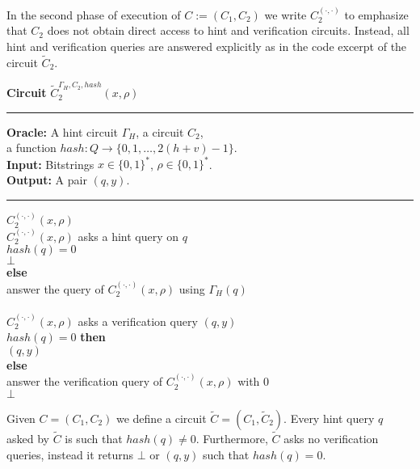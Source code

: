 %
In the second phase of execution of $C := (C_1, C_2)$ we write $C_2^{(\cdot, \cdot)}$ to emphasize that $C_2$ does not obtain
direct access to hint and verification circuits.
Instead, all hint and verification queries are answered explicitly as in the code excerpt of the circuit $\widetilde{C}_2$.
%
\begin{codeblock}
  \textbf{Circuit} $\widetilde{C}_2^{\Gamma_H, C_2, hash} (x, \rho)$
  \medskip \hrule \medskip
  \textbf{Oracle:} A hint circuit $\Gamma_H$, a circuit $C_2$, \\
  \IndII a function $hash : Q \rightarrow \{0,1,\dots, 2(h+v)-1\}$. \\
  \textbf{Input:} Bitstrings $x \in \{0,1\}^{*}$, $\rho \in \{0,1\}^{*}$. \\
  \textbf{Output:} A pair $(q, y)$.
  \medskip\hrule\medskip
  \Run $C_2^{(\cdot, \cdot)}(x, \rho)$ \\
  \IndI \If $C_2^{(\cdot, \cdot)}(x, \rho)$ asks a hint query on $q$ \Then\\
  \IndII \If $hash(q) = 0$ \Then\\
  \IndIII \Return $\bot$\\
  \IndII \textbf{else}\\
  \IndIII answer the query of $C_2^{(\cdot, \cdot)}(x, \rho)$ using $\Gamma_H(q)$\\
  \\
  \IndI \If $C_2^{(\cdot, \cdot)}(x, \rho)$ asks a verification query $(q, y)$ \Then \\
  \IndII \If $hash(q) = 0 $ \textbf{then} \\
  \IndIII \Return $(q, y)$ \\
  \IndII \textbf{else} \\
  \IndIII answer the verification query of $C_2^{(\cdot, \cdot)}(x, \rho)$ with 0 \\
  \Return $\bot$
\end{codeblock}
%
Given $C = (C_1, C_2)$ we define a circuit $\widetilde{C} = (C_1, \widetilde{C}_2)$.
Every hint query $q$ asked by $\widetilde{C}$ is such that $hash(q) \neq 0$.
Furthermore, $\widetilde{C}$ asks no verification queries, instead it returns $\bot$ or $(q,y)$ such that
$hash(q) = 0$.

